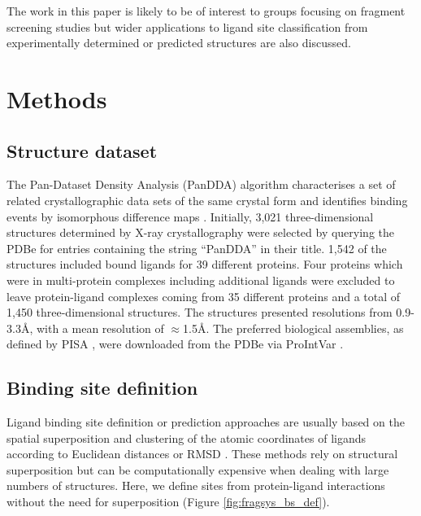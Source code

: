 The work in this paper is likely to be of interest to groups focusing on fragment screening studies but wider applications to ligand site classification from experimentally determined or predicted structures are also discussed. 


\section{Methods}

\subsection{Structure dataset}

The Pan-Dataset Density Analysis (PanDDA) algorithm characterises a set of related crystallographic data sets of the same crystal form and identifies binding events by isomorphous difference maps \cite{PEARCE_2017_PANDDA}.  Initially, 3,021 three-dimensional structures determined by X-ray crystallography were selected by querying the PDBe \cite{wwPDB_2019_PDB} for entries containing the string ``PanDDA'' in their title. 1,542 of the structures included bound ligands for 39 different proteins. Four proteins which were in multi-protein complexes including additional ligands were excluded to leave protein-ligand complexes coming from 35 different proteins and a total of 1,450 three-dimensional structures. The structures presented resolutions from 0.9-3.3\AA{}, with a mean resolution of $\approx$1.5\AA{}. The preferred biological assemblies, as defined by PISA \cite{KRISSINEL_2007_PISA}, were downloaded from the PDBe via ProIntVar \cite{MACGOWAN_2020_DRSASP}. 

\subsection{Binding site definition}

Ligand binding site definition or prediction approaches are usually based on the spatial superposition and clustering of the atomic coordinates of ligands according to Euclidean distances or RMSD \cite{SHIN_2005_PDBLIGAND, KOZAKOV_2005_CLUSTERING, WASS_2010_3DLIGANDSITE, MCGREIG_2022_3DLIGANDSITE}. These methods rely on structural superposition but can be computationally expensive when dealing with large numbers of structures. Here, we define sites from protein-ligand interactions without the need for superposition (Figure \ref{fig:fragsys_bs_def}).

